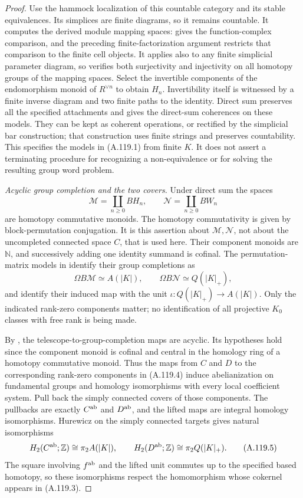 \begin{proof}
Use the hammock localization of this countable category and its
stable equivalences. Its simplices are finite diagrams, so it remains
countable. It computes the derived module mapping spaces:
\cite[Proposition~4.4 and Application~4.6, p.~432]
{DwyerKan1980Functions} gives the function-complex comparison, and
the preceding finite-factorization argument restricts that comparison
to the finite cell objects. It applies also to any finite simplicial
parameter diagram, so verifies both surjectivity and injectivity on
all homotopy groups of the mapping spaces. Select the invertible
components of the endomorphism monoid of $R^{\vee n}$ to obtain
$H_n$. Invertibility itself is witnessed by a finite inverse diagram
and two finite paths to the identity. Direct sum preserves all the
specified attachments and gives the direct-sum coherences on these
models. They can be kept as coherent operations, or rectified by the
simplicial bar construction; that construction uses finite strings
and preserves countability. This specifies the models in (A.119.1)
from finite $K$. It does not assert a terminating procedure for
recognizing a non-equivalence or for solving the resulting group
word problem.

\emph{Acyclic group completion and the two covers.}
Under direct sum the spaces
\[
 \mathcal M=\coprod_{n\geq0}BH_n,
 \qquad \mathcal N=\coprod_{n\geq0}BW_n
\]
are homotopy commutative monoids. The homotopy commutativity is
given by block-permutation conjugation. It is this assertion about
$\mathcal M,\mathcal N$, not about the uncompleted connected space
$C$, that is used here. Their component monoids are $\mathbb N$, and
successively adding one identity summand is cofinal. The
permutation-matrix models in \cite[\S2, p.~247]{Jahren2010}
identify their group completions as
\[
 \Omega B\mathcal M\simeq A(|K|),
 \qquad \Omega B\mathcal N\simeq Q(|K|_+),
                                                               \tag{A.119.4}
\]
and identify their induced map with the unit
$\iota:Q(|K|_+)\to A(|K|)$. Only the indicated rank-zero
components matter; no identification of all projective $K_0$
classes with free rank is being made.

By \cite[Proposition~1.1 and proof pp.~1--7, especially p.~3]
{Gritschacher2026Acyclicity}, the telescope-to-group-completion maps
are acyclic. Its hypotheses hold since the component monoid is
cofinal and central in the homology ring of a homotopy commutative
monoid. Thus the maps from $C$ and $D$ to the corresponding
rank-zero components in (A.119.4) induce abelianization on fundamental
groups and homology isomorphisms with every local coefficient
system. Pull back the simply connected covers of those components.
The pullbacks are exactly $C^{\rm ab}$ and $D^{\rm ab}$, and the
lifted maps are integral homology isomorphisms. Hurewicz on the
simply connected targets gives natural isomorphisms
\[
 H_2(C^{\rm ab};\mathbb Z)\cong\pi_2A(|K|),
 \qquad H_2(D^{\rm ab};\mathbb Z)\cong\pi_2Q(|K|_+).
                                                               \tag{A.119.5}
\]
The square involving $f^{\rm ab}$ and the lifted unit commutes up
to the specified based homotopy, so these isomorphisms respect the
homomorphism whose cokernel appears in (A.119.3).


\end{proof}
